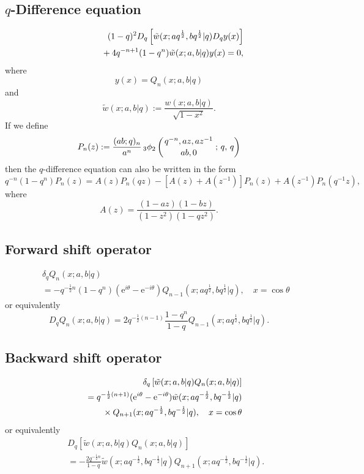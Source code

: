 \documentclass[envcountchap,graybox]{svmono}
\newcommand{\qhyp}[5]{\mbox{}_{#1}{\phi}_{#2}
\left(\genfrac{}{}{0pt}{}{#3}{#4}\,;\,q,\,#5\right)}
\newcommand{\mathindent}{\hspace{7.5mm}}
\newcommand{\e}{\textrm{e}}
\newcommand{\qhyp}[5]{\,\mbox{}_{#1}\phi_{#2}\!\left(
  \genfrac{}{}{0pt}{}{#3}{#4};#5\right)}
\begin{document}
\newpage

\subsection*{$q$-Difference equation}
\begin{eqnarray}
\label{dvAlSalamChihara1}
& &(1-q)^2D_q\left[{\tilde w}(x;aq^{\frac{1}{2}},bq^{\frac{1}{2}}|q)D_qy(x)\right]\nonumber\\
& &{}\mathindent{}+4q^{-n+1}(1-q^n){\tilde w}(x;a,b|q)y(x)=0,
\end{eqnarray}
where
$$y(x)=Q_n(x;a,b|q)$$
and
$${\tilde w}(x;a,b|q):=\frac{w(x;a,b|q)}{\sqrt{1-x^2}}.$$
If we define
$$P_n(z):=\frac{(ab;q)_n}{a^n}\,\qhyp{3}{2}{q^{-n},az,az^{-1}}{ab,0}{q}$$
then the $q$-difference equation can also be written in the form
\begin{equation}
\label{dvAlSalamChihara2}
q^{-n}(1-q^n)P_n(z)=A(z)P_n(qz)-\left[A(z)+A(z^{-1})\right]P_n(z)
+A(z^{-1})P_n(q^{-1}z),
\end{equation}
where
$$A(z)=\frac{(1-az)(1-bz)}{(1-z^2)(1-qz^2)}.$$

\subsection*{Forward shift operator}
\begin{eqnarray}
\label{shift1AlSalamChiharaI}
& &\delta_qQ_n(x;a,b|q)\nonumber\\
& &{}=-q^{-\frac{1}{2}n}(1-q^n)(\e^{i\theta}-\e^{-i\theta})
Q_{n-1}(x;aq^{\frac{1}{2}},bq^{\frac{1}{2}}|q),\quad x=\cos\theta
\end{eqnarray}
or equivalently
\begin{equation}
\label{shift1AlSalamChiharaII}
D_qQ_n(x;a,b|q)=2q^{-\frac{1}{2}(n-1)}
\frac{1-q^n}{1-q}Q_{n-1}(x;aq^{\frac{1}{2}},bq^{\frac{1}{2}}|q).
\end{equation}

\subsection*{Backward shift operator}
\begin{eqnarray}
\label{shift2AlSalamChiharaI}
& &\delta_q\left[{\tilde w}(x;a,b|q)Q_n(x;a,b|q)\right]\nonumber\\
& &{}=q^{-\frac{1}{2}(n+1)}(\e^{i\theta}-\e^{-i\theta})
{\tilde w}(x;aq^{-\frac{1}{2}},bq^{-\frac{1}{2}}|q)\nonumber\\
& &{}\mathindent{}\times Q_{n+1}(x;aq^{-\frac{1}{2}},bq^{-\frac{1}{2}}|q),
\quad x=\cos\theta
\end{eqnarray}
or equivalently
\begin{eqnarray}
\label{shift2AlSalamChiharaII}
& &D_q\left[{\tilde w}(x;a,b|q)Q_n(x;a,b|q)\right]\nonumber\\
& &{}=-\frac{2q^{-\frac{1}{2}n}}{1-q}{\tilde w}(x;aq^{-\frac{1}{2}},bq^{-\frac{1}{2}}|q)
Q_{n+1}(x;aq^{-\frac{1}{2}},bq^{-\frac{1}{2}}|q).
\end{eqnarray}
\end{document}
